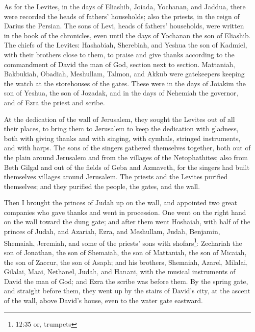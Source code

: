 \myverse{}As for the Levites, in the days of Eliashib, Joiada, Yochanan,
and Jaddua, there were recorded the heads of fathers’ households; also the priests, in the reign of Darius
the Persian.
\myverse{}The sons of Levi, heads of fathers’ households, were written in the book
of the chronicles, even until the days of Yochanan the son of Eliashib.
\myverse{}The chiefs of the Levites: Hashabiah, Sherebiah, and Yeshua the son of Kadmiel,
with their brothers close to them, to praise and give thanks according to the commandment of David the
man of God, section next to section.
\myverse{}Mattaniah, Bakbukiah, Obadiah, Meshullam, Talmon, and Akkub were gatekeepers
keeping the watch at the storehouses of the gates.
\myverse{}These were in the days of Joiakim the son of Yeshua, the son of Jozadak,
and in the days of Nehemiah the governor, and of Ezra the priest and scribe.

\myverse{}At the dedication of the wall of Jerusalem, they sought the
Levites out of all their places, to bring them to Jerusalem to keep the dedication with gladness, both
with giving thanks and with singing, with cymbals, stringed instruments, and with harps.
\myverse{}The sons of the singers gathered themselves together, both out of the plain
around Jerusalem and from the villages of the Netophathites;
\myverse{}also from Beth Gilgal and out of the fields of Geba and Azmaveth, for the
singers had built themselves villages around Jerusalem.
\myverse{}The priests and the Levites purified themselves; and they purified the people,
the gates, and the wall.

\myverse{}Then I brought the princes of Judah up on the wall, and appointed
two great companies who gave thanks and went in procession. One went on the right hand on the wall toward
the dung gate;
\myverse{}and after them went Hoshaiah, with half of the princes of Judah,
\myverse{}and Azariah, Ezra, and Meshullam,
\myverse{}Judah, Benjamin, Shemaiah, Jeremiah,
\myverse{}and some of the priests’ sons with shofars\footnote{12:35 or, trumpets}:
Zechariah the son of Jonathan, the son of Shemaiah, the son of Mattaniah, the son of Micaiah, the son
of Zaccur, the son of Asaph;
\myverse{}and his brothers, Shemaiah, Azarel, Milalai, Gilalai, Maai, Nethanel, Judah,
and Hanani, with the musical instruments of David the man of God; and Ezra the scribe was before them.
\myverse{}By the spring gate, and straight before them, they went up by the stairs
of David’s city, at the ascent of the wall, above David’s house, even to the water gate eastward.

